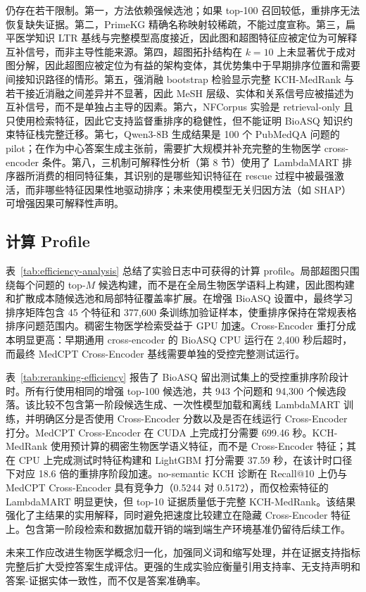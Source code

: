 仍存在若干限制。第一，方法依赖强候选池；如果 top-100 召回较低，重排序无法恢复缺失证据。第二，PrimeKG 精确名称映射较稀疏，不能过度宣称。第三，扁平医学知识 LTR 基线与完整模型高度接近，因此图和超图特征应被定位为可解释互补信号，而非主导性能来源。第四，超图拓扑结构在 $k{=}10$ 上未显著优于成对图分解，因此超图应被定位为有益的架构变体，其优势集中于早期排序位置和需要间接知识路径的情形。第五，强消融 bootstrap 检验显示完整 KCH-MedRank 与若干接近消融之间差异并不显著，因此 MeSH 层级、实体和关系信号应被描述为互补信号，而不是单独占主导的因素。第六，NFCorpus 实验是 retrieval-only 且只使用检索特征，因此它支持监督重排序的稳健性，但不能证明 BioASQ 知识约束特征栈完整迁移。第七，Qwen3-8B 生成结果是 100 个 PubMedQA 问题的 pilot；在作为中心答案生成主张前，需要扩大规模并补充完整的生物医学 cross-encoder 条件。第八，三机制可解释性分析（第 8 节）使用了 LambdaMART 排序器所消费的相同特征集，其识别的是哪些知识特征在 rescue 过程中被最强激活，而非哪些特征因果性地驱动排序；未来使用模型无关归因方法（如 SHAP）可增强因果可解释性声明。

\subsection{计算 Profile}



表~\ref{tab:efficiency-analysis} 总结了实验日志中可获得的计算 profile。局部超图只围绕每个问题的 top-$M$ 候选构建，而不是在全局生物医学语料上构建，因此图构建和扩散成本随候选池和局部特征覆盖率扩展。在增强 BioASQ 设置中，最终学习排序矩阵包含 45 个特征和 377,600 条训练加验证样本，使重排序保持在常规表格排序问题范围内。稠密生物医学检索受益于 GPU 加速。Cross-Encoder 重打分成本明显更高：早期通用 cross-encoder 的 BioASQ CPU 运行在 2,400 秒后超时，而最终 MedCPT Cross-Encoder 基线需要单独的受控完整测试运行。



表~\ref{tab:reranking-efficiency} 报告了 BioASQ 留出测试集上的受控重排序阶段计时。所有行使用相同的增强 top-100 候选池，共 943 个问题和 94,300 个候选段落。该比较不包含第一阶段候选生成、一次性模型加载和离线 LambdaMART 训练，并明确区分是否使用 Cross-Encoder 分数以及是否在线运行 Cross-Encoder 打分。MedCPT Cross-Encoder 在 CUDA 上完成打分需要 699.46 秒。KCH-MedRank 使用预计算的稠密生物医学语义特征，而不是 Cross-Encoder 特征；其在 CPU 上完成测试时特征构建和 LightGBM 打分需要 37.59 秒，在该计时口径下对应 18.6 倍的重排序阶段加速。no-semantic KCH 诊断在 Recall@10 上仍与 MedCPT Cross-Encoder 具有竞争力（0.5244 对 0.5172），而仅检索特征的 LambdaMART 明显更快，但 top-10 证据质量低于完整 KCH-MedRank。该结果强化了主结果的实用解释，同时避免把速度比较建立在隐藏 Cross-Encoder 特征上。包含第一阶段检索和数据加载开销的端到端生产环境基准仍留待后续工作。

未来工作应改进生物医学概念归一化，加强同义词和缩写处理，并在证据支持指标完整后扩大受控答案生成评估。更强的生成实验应衡量引用支持率、无支持声明和答案-证据实体一致性，而不仅是答案准确率。

